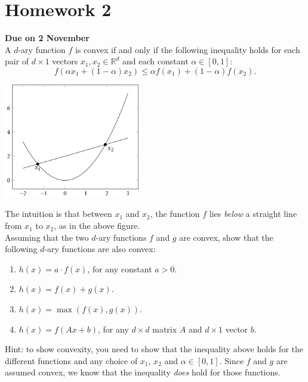 \documentclass{article}
\begin{document}
  \section*{Homework 2}

  {\bf Due on 2 November}\\

  A $d$-ary function $f$ is convex if and only if the following inequality holds for each pair of $d\times 1$ vectors $x_1,x_2\in \mathbb{R}^d$ and each constant $\alpha\in[0,1]$:
\[
f(\alpha x_1 + (1-\alpha)x_2) \leq \alpha f(x_1) + (1-\alpha) f(x_2).
\]

\centerline{\includegraphics[height=5cm]{convexfun.png}}

\noindent
The intuition is that between $x_1$ and $x_2$, the function $f$ lies {\em below} a straight line from $x_1$ to $x_2$, as in the above figure.\\

Assuming that the two $d$-ary functions $f$ and $g$ are convex, show that the following $d$-ary functions are also convex:
\begin{enumerate}
\item $h(x) = a\cdot f(x)$, for any constant $a>0$.
\item $h(x) = f(x) + g(x)$.
\item $h(x) = \max(f(x),g(x))$.
\item $h(x) = f(Ax + b)$, for any $d\times d$ matrix $A$ and $d\times 1$ vector $b$.
\end{enumerate}
Hint: to show convexity, you need to show that the inequality above holds for the different functions and any choice of $x_1$, $x_2$ and $\alpha\in[0,1]$. Since $f$ and $g$ are assumed convex, we know that the inequality {\em does} hold for those functions.
\end{document}
